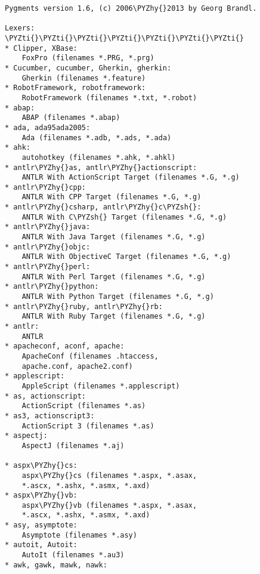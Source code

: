 \begin{Verbatim}[commandchars=\\\{\}]
Pygments version 1.6, (c) 2006\PYZhy{}2013 by Georg Brandl.

Lexers:
\PYZti{}\PYZti{}\PYZti{}\PYZti{}\PYZti{}\PYZti{}\PYZti{}
* Clipper, XBase:
    FoxPro (filenames *.PRG, *.prg)
* Cucumber, cucumber, Gherkin, gherkin:
    Gherkin (filenames *.feature)
* RobotFramework, robotframework:
    RobotFramework (filenames *.txt, *.robot)
* abap:
    ABAP (filenames *.abap)
* ada, ada95ada2005:
    Ada (filenames *.adb, *.ads, *.ada)
* ahk:
    autohotkey (filenames *.ahk, *.ahkl)
* antlr\PYZhy{}as, antlr\PYZhy{}actionscript:
    ANTLR With ActionScript Target (filenames *.G, *.g)
* antlr\PYZhy{}cpp:
    ANTLR With CPP Target (filenames *.G, *.g)
* antlr\PYZhy{}csharp, antlr\PYZhy{}c\PYZsh{}:
    ANTLR With C\PYZsh{} Target (filenames *.G, *.g)
* antlr\PYZhy{}java:
    ANTLR With Java Target (filenames *.G, *.g)
* antlr\PYZhy{}objc:
    ANTLR With ObjectiveC Target (filenames *.G, *.g)
* antlr\PYZhy{}perl:
    ANTLR With Perl Target (filenames *.G, *.g)
* antlr\PYZhy{}python:
    ANTLR With Python Target (filenames *.G, *.g)
* antlr\PYZhy{}ruby, antlr\PYZhy{}rb:
    ANTLR With Ruby Target (filenames *.G, *.g)
* antlr:
    ANTLR
* apacheconf, aconf, apache:
    ApacheConf (filenames .htaccess,
    apache.conf, apache2.conf)
* applescript:
    AppleScript (filenames *.applescript)
* as, actionscript:
    ActionScript (filenames *.as)
* as3, actionscript3:
    ActionScript 3 (filenames *.as)
* aspectj:
    AspectJ (filenames *.aj)

* aspx\PYZhy{}cs:
    aspx\PYZhy{}cs (filenames *.aspx, *.asax,
    *.ascx, *.ashx, *.asmx, *.axd)
* aspx\PYZhy{}vb:
    aspx\PYZhy{}vb (filenames *.aspx, *.asax,
    *.ascx, *.ashx, *.asmx, *.axd)
* asy, asymptote:
    Asymptote (filenames *.asy)
* autoit, Autoit:
    AutoIt (filenames *.au3)
* awk, gawk, mawk, nawk:


\end{Verbatim}
